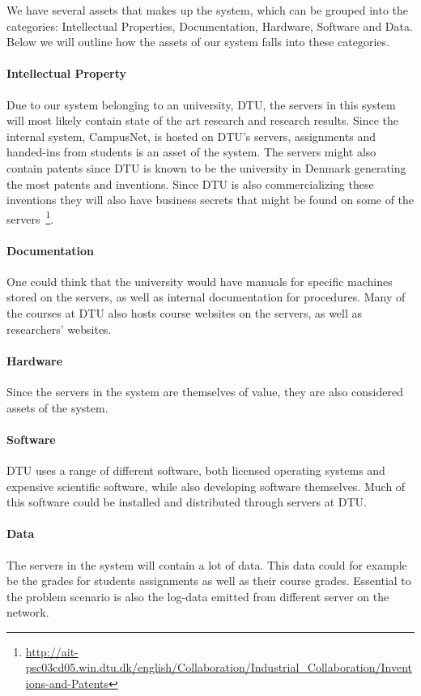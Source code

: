 We have several assets that makes up the system, which can be grouped
into the categories: Intellectual Properties, Documentation, Hardware,
Software and Data. Below we will outline how the assets of our system
falls into these categories.

\paragraph{Intellectual Property}
Due to our system belonging to an university, DTU, the servers in this
system will most likely contain state of the art research and research
results. Since the internal system, CampusNet, is hosted on DTU's
servers, assignments and handed-ins from students is an asset of the
system. The servers might also contain patents since DTU is known to
be the university in Denmark generating the most patents and
inventions. Since DTU is also commercializing these inventions they
will also have business secrets that might be found on some of the
servers~\footnote{\raggedright \url{
    http://ait-psc03cd05.win.dtu.dk/english/Collaboration/Industrial_Collaboration/Inventions-and-Patents}}.

\paragraph{Documentation}
One could think that the university would have manuals for specific
machines stored on the servers, as well as internal documentation for
procedures. Many of the courses at DTU also hosts course websites on
the servers, as well as researchers' websites.

\paragraph{Hardware}
Since the servers in the system are themselves of value, they are also
considered assets of the system.

\paragraph{Software}
DTU uses a range of different software, both licensed operating
systems and expensive scientific software, while also developing
software themselves. Much of this software could be installed and
distributed through servers at DTU.

\paragraph{Data}
The servers in the system will contain a lot of data. This data could
for example be the grades for students assignments as well as their
course grades. Essential to the problem scenario is also the log-data
emitted from different server on the network.

